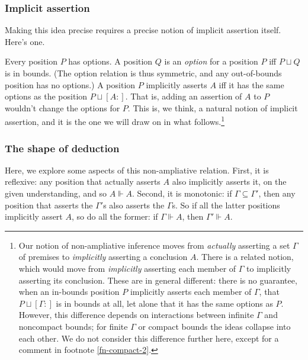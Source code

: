 \documentclass{article}
\newcommand{\G}{\ensuremath{\Gamma}}
\newcommand{\pcup}{\ensuremath{\sqcup}}
\newcommand{\pos}[2]{\ensuremath{[#1:#2]}}
\newcommand{\ded}{\Vdash}
\begin{document}
\subsubsection{Implicit assertion}

Making this idea precise requires a precise notion of implicit assertion itself.
Here's one.

Every position $P$ has options.
A position $Q$ is an {\em option} for a position $P$ iff $P \pcup Q$ is in bounds.
(The option relation is thus symmetric, and any out-of-bounds position has no options.)
A position $P$ implicitly asserts $A$ iff it has the same options as the position $P \pcup \pos{A}{}$.
That is, adding an assertion of $A$ to $P$ wouldn't change the options for $P$.
This is, we think, a natural notion of implicit assertion, and it is the one we will draw on in what follows.\footnote{\label{fn-compact-1}Our notion of non-ampliative inference moves from {\em actually} asserting a set $\G$ of premises to {\em implicitly} asserting a conclusion $A$.
There is a related notion, which would move from {\em implicitly} asserting each member of $\G$ to implicitly asserting its conclusion.
These are in general different: there is no guarantee, when an in-bounds position $P$ implicitly asserts each member of $\G$, that $P \pcup \pos{\G}{}$ is in bounds at all, let alone that it has the same options as $P$.
However, this difference depends on interactions between infinite $\G$ and noncompact bounds; for finite $\G$ or compact bounds the ideas collapse into each other.
We do not consider this difference further here, except for a comment in footnote \ref{fn-compact-2}.
}


\subsubsection{The shape of deduction}

Here, we explore some aspects of this non-ampliative relation.
First, it is reflexive: any position that actually asserts $A$ also implicitly asserts it, on the given understanding, and so $A \ded A$. Second, it is monotonic: if $\G \subseteq \G'$, then any position that asserts the $\G'$s also asserts the $\G$s. So if all the latter positions implicitly assert $A$, so do all the former: if $\G \ded A$, then $\G' \ded A$.
\end{document}
